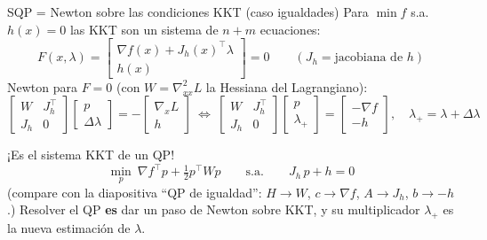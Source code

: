 \documentclass[aspectratio=169]{beamer}
\newcommand{\grad}{\nabla}
\begin{document}
\begin{frame}{SQP = Newton sobre las condiciones KKT (caso igualdades)}
  \small
  Para $\min f$ s.a.\ $h(x)=0$ las KKT son un sistema de $n+m$ ecuaciones:
  \[ F(x,\lambda)=\begin{bmatrix}\grad f(x)+J_h(x)^\top\lambda\\ h(x)\end{bmatrix}=0 \qquad (J_h=\text{jacobiana de }h) \]
  Newton para $F=0$ (con $W=\grad^2_{xx}L$ la Hessiana del Lagrangiano):
  \[ \begin{bmatrix}W&J_h^\top\\J_h&0\end{bmatrix}\begin{bmatrix}p\\\Delta\lambda\end{bmatrix}=-\begin{bmatrix}\grad_xL\\h\end{bmatrix}
     \ \Longleftrightarrow\
     \boxed{\begin{bmatrix}W&J_h^\top\\J_h&0\end{bmatrix}\begin{bmatrix}p\\\lambda_{+}\end{bmatrix}=\begin{bmatrix}-\grad f\\-h\end{bmatrix}},\quad \lambda_+=\lambda+\Delta\lambda \]
  \begin{alertblock}{¡Es el sistema KKT de un QP!}
    \[ \min_p\ \grad f^\top p+\tfrac12p^\top Wp\qquad\text{s.a.}\qquad J_h\,p+h=0 \]
    (compare con la diapositiva ``QP de igualdad'': $H\to W$, $c\to\grad f$, $A\to J_h$, $b\to-h$.) Resolver el QP \textbf{es} dar un paso de Newton sobre KKT, y su multiplicador $\lambda_+$ es la nueva estimación de $\lambda$.
  \end{alertblock}
\end{frame}
\end{document}
